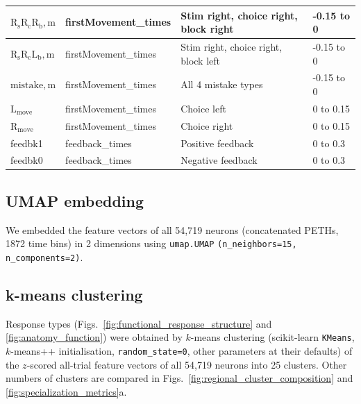 \documentclass[10pt,lineno]{elife}
\begin{document}
\begin{table}[h!]
\begin{tabular}{|l|l|l|l|}
$\mathrm{R_{s}R_{c}R_{b},m}$ & firstMovement\_times & Stim right, choice right, block right & -0.15 to 0 \\ \hline
$\mathrm{R_{s}R_{c}L_{b},m}$ & firstMovement\_times & Stim right, choice right, block left & -0.15 to 0 \\ \hline
$\mathrm{mistake,m}$ & firstMovement\_times & All 4 mistake types & -0.15 to 0 \\ \hline
$\mathrm{L_{move}}$ & firstMovement\_times & Choice left & 0 to 0.15 \\ \hline
$\mathrm{R_{move}}$ & firstMovement\_times & Choice right & 0 to 0.15 \\ \hline
\textup{feedbk1} & feedback\_times & Positive feedback & 0 to 0.3 \\ \hline
\textup{feedbk0} & feedback\_times & Negative feedback & 0 to 0.3 \\ \hline
\end{tabular}
\end{table}
\FloatBarrier

\subsection{UMAP embedding}

We embedded the feature vectors of all 54,719 neurons (concatenated PETHs, 1872 time bins) in 2 dimensions using \verb|umap.UMAP| \verb|(n_neighbors=15, n_components=2)|\cite{mcinnes2018umap}.

\subsection{k-means clustering}
Response types (Figs.~\ref{fig:functional_response_structure} and \ref{fig:anatomy_function}) were obtained by $k$-means clustering (scikit-learn \texttt{KMeans}, $k$-means++ initialisation, \texttt{random\_state=0}, other parameters at their defaults) of the $z$-scored all-trial feature vectors of all 54,719 neurons into 25 clusters. Other numbers of clusters are compared in Figs.~\ref{fig:regional_cluster_composition} and \ref{fig:specialization_metrics}a.
\end{document}

